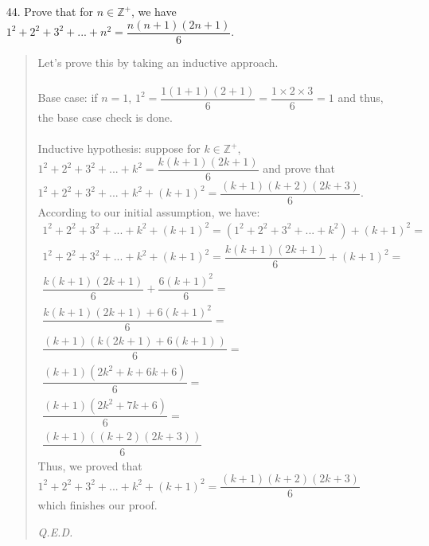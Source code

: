 \documentclass[12pt, a4paper]{article}                      %
\newcommand{\intzp}{\mathbb{Z^+}}
\begin{document}
\begin{itemize}
\item[44.]
Prove that for $n \in \intzp$, we have $1^2 + 2^2 + 3^2 + ... + n^2 = \dfrac{n(n + 1)(2n + 1)}{6}$.
\begin{quote}
Let's prove this by taking an inductive approach.\\\\
Base case: if $n = 1$, $1^2 = \dfrac{1(1 + 1)(2 + 1)}{6} = \dfrac{1 \times 2 \times 3}{6} = 1$ and thus, the base case check is done.\\\\
Inductive hypothesis: suppose for $k \in \intzp$, $1^2 + 2^2 + 3^2 + ... + k^2 = \dfrac{k(k + 1)(2k + 1)}{6}$ and prove that $1^2 + 2^2 + 3^2 + ... + k^2 + (k + 1)^2 = \dfrac{(k + 1)(k + 2)(2k + 3)}{6}$.
According to our initial assumption, we have:\\
\begin{align*}
1^2 + 2^2 + 3^2 + ... + k^2 + (k + 1)^2 = (1^2 + 2^2 + 3^2 + ... + k^2) + (k + 1)^2 =\\
1^2 + 2^2 + 3^2 + ... + k^2 + (k + 1)^2 = \dfrac{k(k + 1)(2k + 1)}{6} + (k + 1)^2 =\\
\dfrac{k(k + 1)(2k + 1)}{6} + \dfrac{6(k + 1)^2}{6} =\\
\dfrac{k(k + 1)(2k + 1) + 6(k + 1)^2}{6} =\\
\dfrac{(k + 1)(k(2k + 1) + 6(k + 1))}{6} =\\
\dfrac{(k + 1)(2k^2 + k + 6k + 6)}{6} =\\
\dfrac{(k + 1)(2k^2 + 7k + 6)}{6} =\\
\dfrac{(k + 1)((k + 2)(2k + 3))}{6}
\end{align*}
Thus, we proved that $1^2 + 2^2 + 3^2 + ... + k^2 + (k + 1)^2 = \dfrac{(k + 1)(k + 2)(2k + 3)}{6}$ which finishes
our proof.
\begin{flushright}
\textit{Q.E.D.}
\end{flushright}
\end{quote}

\item[]


\end{itemize}
\end{document}
